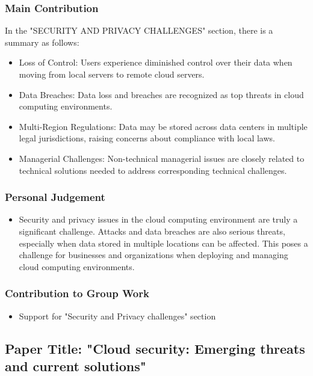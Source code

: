 \documentclass[12pt, twoside]{article}
\begin{document}
\subsubsection{Main Contribution}
In the "SECURITY AND PRIVACY CHALLENGES" section, there is a summary as follows:
\begin{itemize}
\item Loss of Control: Users experience diminished control over their data when moving from local servers to remote cloud servers.
\item Data Breaches: Data loss and breaches are recognized as top threats in cloud computing environments.
\item Multi-Region Regulations: Data may be stored across data centers in multiple legal jurisdictions, raising concerns about compliance with local laws.
\item Managerial Challenges: Non-technical managerial issues are closely related to technical solutions needed to address corresponding technical challenges.
\end{itemize}

\subsubsection{Personal Judgement}
\begin{itemize}
\item Security and privacy issues in the cloud computing environment are truly a significant challenge. Attacks and data breaches are also serious threats, especially when data stored in multiple locations can be affected. This poses a challenge for businesses and organizations when deploying and managing cloud computing environments.
\end{itemize}

\subsubsection{Contribution to Group Work}
\begin{itemize}
\item Support for "Security and Privacy challenges" section
\end{itemize}
\subsection{Paper Title: "Cloud security: Emerging threats and current solutions" \cite{coppolino2017cloud}}
\end{document}
